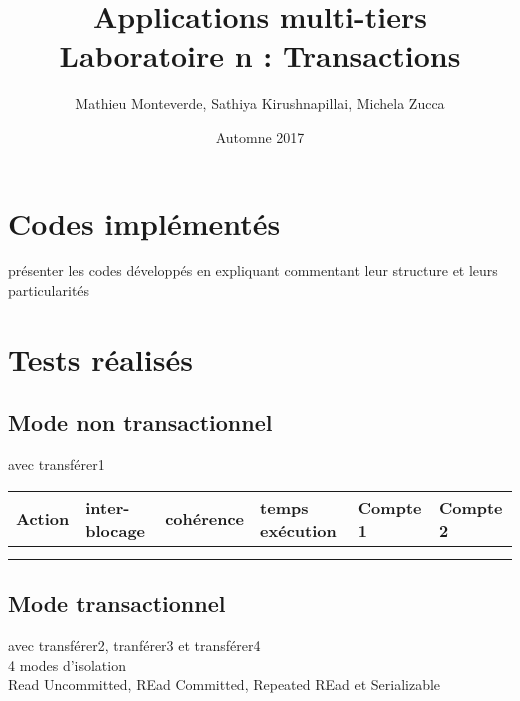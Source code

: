 \documentclass[francais,12pt]{article}
\title{Applications multi-tiers \\ Laboratoire n\textordmasculine2 : Transactions}
\author{Mathieu Monteverde, Sathiya Kirushnapillai, Michela Zucca}
\date{Automne 2017}
\begin{document}
	
	\maketitle
	
	\setlength{\parskip}{1em}
	
	\section*{Codes implémentés}
	présenter les codes développés en expliquant commentant leur structure et leurs particularités
	\section*{Tests réalisés}
	\subsection*{Mode non transactionnel}
	avec transférer1
	
		\begin{tabular}{|l|l|l|l|l|l|}
		\hline
		 Action & inter-blocage & cohérence & temps exécution & Compte 1 & Compte 2\\
		\hline
		\rowcolor{lightgray}\multicolumn{6}{|l|}{transférer1}\\
		\hline
		 & & & & &\\
		\hline
	\end{tabular}
	
	
	\subsection*{Mode transactionnel}
	avec transférer2, tranférer3 et transférer4\\
	4 modes d'isolation\\
	Read Uncommitted, REad Committed, Repeated REad et Serializable
	
\end{document}
